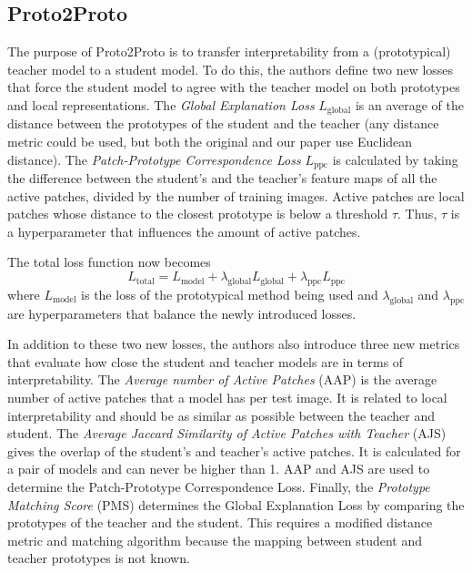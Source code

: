 \subsection{Proto2Proto}
The purpose of Proto2Proto is to transfer interpretability from a (prototypical) teacher model to a student model. To do this, the authors define two new losses that force the student model to agree with the teacher model on both prototypes and local representations. The \textit{Global Explanation Loss} $L_{\text{global}}$ is an average of the distance between the prototypes of the student and the teacher (any distance metric could be used, but both the original and our paper use Euclidean distance). The \textit{Patch-Prototype Correspondence Loss} $L_{\text{ppc}}$ is calculated by taking the difference between the student's and the teacher's feature maps of all the active patches, divided by the number of training images. Active patches are local patches whose distance to the closest prototype is below a threshold $\tau$. Thus, $\tau$ is a hyperparameter that influences the amount of active patches.

The total loss function now becomes $$L_{\text{total}} = L_{\text{model}} + \lambda_{\text{global}} L_{\text{global}} + \lambda_{\text{ppc}} L_{\text{ppc}}$$
where $L_{\text{model}}$ is the loss of the prototypical method being used and $\lambda_{\text{global}}$ and $\lambda_{\text{ppc}}$ are hyperparameters that balance the newly introduced losses.\par


In addition to these two new losses, the authors also introduce three new metrics that evaluate how close the student and teacher models are in terms of interpretability. The \textit{Average number of Active Patches} (AAP) is the average number of active patches that a model has per test image. It is related to local interpretability and should be as similar as possible between the teacher and student.
The \textit{Average Jaccard Similarity of Active Patches with Teacher} (AJS) gives the overlap of the student's and teacher's active patches. It is calculated for a pair of models and can never be higher than 1. AAP and AJS are used to determine the Patch-Prototype Correspondence Loss.
Finally, the \textit{Prototype Matching Score} (PMS) determines the Global Explanation Loss by comparing the prototypes of the teacher and the student. This requires a modified distance metric and matching algorithm because the mapping between student and teacher prototypes is not known.



